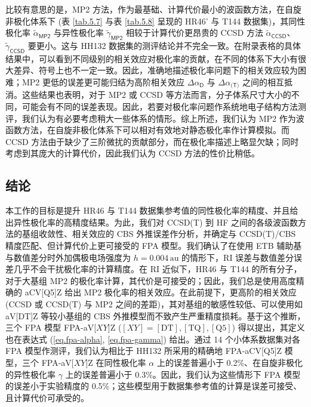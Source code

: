 比较有意思的是，MP2 方法，作为最基础、计算代价最小的波函数方法，在自旋非极化体系下 (表 \ref{tab.5.7} 与表 \ref{tab.5.8} 呈现的 HR46' 与 T144 数据集)，其同性极化率 $\tilde \alpha_\textsf{MP2}$ 与异性极化率 $\tilde \gamma_\textsf{MP2}$ 相较于计算代价更昂贵的 CCSD 方法 $\tilde \alpha_\textsf{CCSD}$、$\tilde \gamma_\textsf{CCSD}$ 要更小。这与 HH132 数据集的测评结论并不完全一致\cite{Hait-Head-Gordon.PCCP.2018}。在\alert{附录表格}的具体结果中，可以看到不同级别的相关效应对极化率的贡献，在不同的体系下大小有很大差异、符号上也不一定一致。因此，准确地描述极化率问题下的相关效应较为困难；MP2 更低的误差更可能归结为高阶相关效应 $\Delta \alpha_\textsf{D}$ 与 $\Delta \alpha_\textsf{(T)}$ 之间的相互抵消。这些结果也表明，对于 MP2 或 CCSD 等方法而言，分子体系尺寸大小的不同，可能会有不同的误差表现。因此，若要对极化率问题作系统地电子结构方法测评，我们认为有必要考虑稍大一些体系的情形。综上所述，我们认为 MP2 作为波函数方法，在自旋非极化体系下可以相对有效地对静态极化率作计算模拟。而 CCSD 方法由于缺少了三阶微扰的贡献部分，而在极化率描述上略显欠缺；同时考虑到其庞大的计算代价，因此我们认为 CCSD 方法的性价比稍低。

\subsection{结论}

本工作的目标是提升 HR46 与 T144 数据集参考值的同性极化率的精度、并且给出异性极化率的高精度结果。为此，我们对 CCSD(T) 到 HF 之间的各级波函数方法的基组收敛性、相关效应的 CBS 外推误差作分析，并确定与 CCSD(T)/CBS 精度匹配、但计算代价上更可接受的 FPA 模型。我们确认了在使用 ETB 辅助基与数值差分时外加偶极电场强度为 $h = 0.004 \, \text{au}$ 的情形下，RI 误差与数值差分误差几乎不会干扰极化率的计算精度。在 RI 近似下，HR46 与 T144 的所有分子，对于大基组 MP2 的极化率计算，其代价是可接受的；因此，我们总是使用高度精确的 aCV[Q5]Z 给出 MP2 极化率的相关效应。在此前提下，更高阶的相关效应 (CCSD 或 CCSD(T) 与 MP2 之间的差距)，其对基组的敏感性较低、可以使用如 aV[DT]Z 等较小基组的 CBS 外推模型而不致产生严重精度损耗。基于这个推断，三个 FPA 模型 FPA-aV[$XY$]Z ($[XY] = \mathrm{[DT], [TQ], [Q5]}$) 得以提出，其定义也在表达式 (\ref{eq.fpa-alpha}, \ref{eq.fpa-gamma}) 给出。通过 14 个小体系数据集对各 FPA 模型作测评，我们认为相比于 HH132 所采用的精确地 FPA-aCV[Q5]Z 模型，三个 FPA-aV[$XY$]Z 在同性极化率 $\alpha$ 上的误差普遍小于 0.2\%、在自旋非极化的异性极化率 $\gamma$ 上的误差普遍小于 0.3\%。因此，我们认为这些情形下 FPA 模型的误差小于实验精度的 0.5\%；这些模型用于数据集参考值的计算是误差可接受、且计算代价可承受的。

